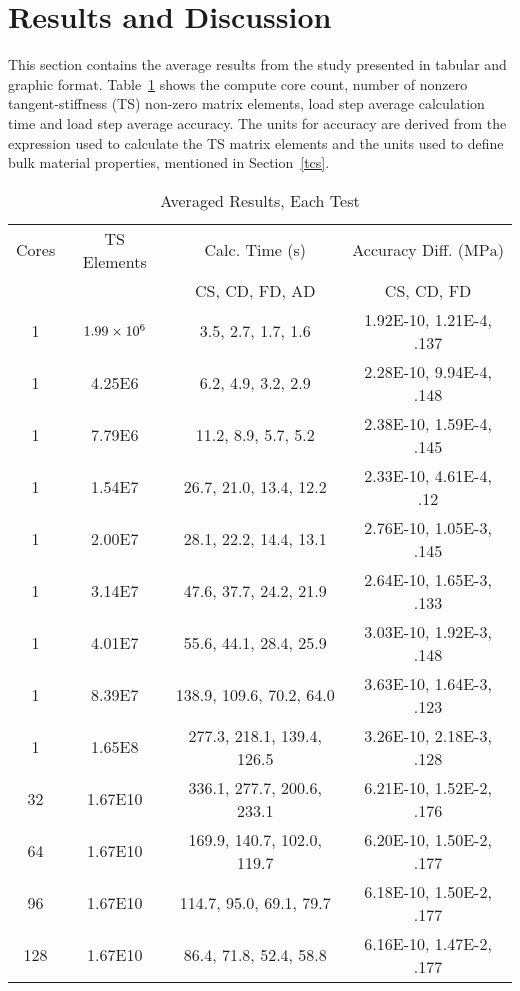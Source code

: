 \documentclass[preprint,12pt]{elsarticle}
\begin{document}
\section{Results and Discussion}
%
This section contains the average results from the study presented in tabular and graphic format.  Table~\ref{tab:results} shows the compute core count, number of nonzero tangent-stiffness (TS) non-zero matrix elements, load step average calculation time and load step average accuracy. The units for accuracy are derived from the
expression used to calculate the TS matrix elements and the units used to define bulk material properties, mentioned in Section~\ref{tcs}.
%
\begin{table}    
        \caption{Averaged Results, Each Test} \label{tab:results}   
    \begin{tabular}{c c c c }
      Cores & TS Elements & Calc. Time (s) & Accuracy Diff. ($\si{\mega\pascal}$)\\ 
    \multicolumn{2}{c}{} & CS, CD, FD, AD & CS, CD, FD \\ \hline 
    1 & $\num{1.99E6}$  & 3.5, 2.7, 1.7, 1.6 & 1.92E-10, 1.21E-4, .137 \\ \hline
	1 & 4.25E6  & 6.2, 4.9, 3.2, 2.9 & 2.28E-10, 9.94E-4, .148 \\ \hline
	1 & 7.79E6  & 11.2, 8.9, 5.7, 5.2 & 2.38E-10, 1.59E-4, .145\\ \hline
	1 & 1.54E7  & 26.7, 21.0, 13.4, 12.2 & 2.33E-10, 4.61E-4, .12 \\ \hline
	1 & 2.00E7  & 28.1, 22.2, 14.4, 13.1 & 2.76E-10, 1.05E-3, .145 \\ \hline
	1 & 3.14E7  & 47.6, 37.7, 24.2, 21.9 & 2.64E-10, 1.65E-3, .133 \\ \hline
	1 & 4.01E7  & 55.6, 44.1, 28.4, 25.9 & 3.03E-10, 1.92E-3, .148 \\ \hline
	1 & 8.39E7  & 138.9, 109.6, 70.2, 64.0 & 3.63E-10, 1.64E-3, .123 \\ \hline
	1 & 1.65E8  & 277.3, 218.1, 139.4, 126.5 & 3.26E-10, 2.18E-3, .128 \\ \hline
	32 & 1.67E10  & 336.1, 277.7, 200.6, 233.1 & 6.21E-10, 1.52E-2, .176 \\ \hline
	64 & 1.67E10  & 169.9, 140.7, 102.0, 119.7 & 6.20E-10, 1.50E-2, .177 \\ \hline
	96 & 1.67E10  & 114.7, 95.0, 69.1, 79.7 & 6.18E-10, 1.50E-2, .177 \\ \hline
	128 & 1.67E10  & 86.4, 71.8, 52.4, 58.8 & 6.16E-10, 1.47E-2, .177 \\ \hline
    \end{tabular}
\end{table}
\end{document}
